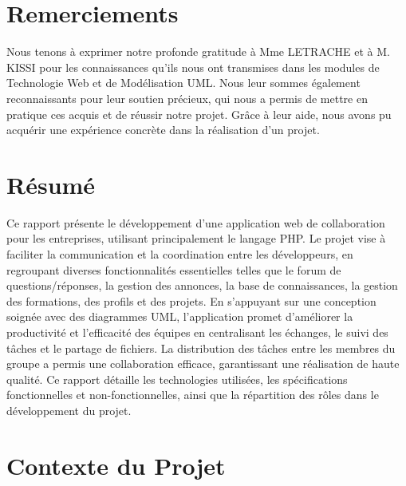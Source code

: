 \documentclass{article}
\begin{document}
    \setcounter{page}{2} 
    \tableofcontents
    \newpage

    \listoffigures

    \listoftables
    \newpage

    \section{Remerciements}
        Nous tenons à exprimer notre profonde gratitude à Mme LETRACHE et à M. KISSI pour les connaissances qu'ils nous ont transmises dans les modules de Technologie Web et de Modélisation UML. Nous leur sommes également reconnaissants pour leur soutien précieux, qui nous a permis de mettre en pratique ces acquis et de réussir notre projet. Grâce à leur aide, nous avons pu acquérir une expérience concrète dans la réalisation d'un projet.
    
    \newpage
    
    \section{Résumé}
        Ce rapport présente le développement d'une application web de collaboration pour les entreprises, utilisant principalement le langage PHP. 
        Le projet vise à faciliter la communication et la coordination entre les développeurs, en regroupant diverses fonctionnalités essentielles telles que le forum de questions/réponses, 
        la gestion des annonces, la base de connaissances, la gestion des formations, des profils et des projets. En s'appuyant sur une conception soignée avec des diagrammes UML, 
        l'application promet d'améliorer la productivité et l'efficacité des équipes en centralisant les échanges, le suivi des tâches et le partage de fichiers. 
        La distribution des tâches entre les membres du groupe a permis une collaboration efficace, garantissant une réalisation de haute qualité. 
        Ce rapport détaille les technologies utilisées, les spécifications fonctionnelles et non-fonctionnelles, ainsi que la répartition des rôles dans le développement du projet.
    \section{Contexte du Projet}
\end{document}
